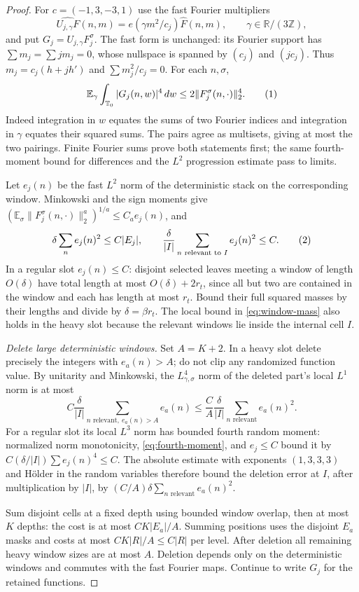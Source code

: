 \documentclass[11pt]{article}
\theoremstyle{definition}
\newcommand{\R}{\mathbb R}
\newcommand{\Z}{\mathbb Z}
\newcommand{\T}{\mathbb T}
\newcommand{\E}{\mathbb E}
\newcommand{\eqtag}[1]{\refstepcounter{equation}\tag{\theequation}\label{#1}}
\numberwithin{equation}{section}
\begin{document}
\begin{proof}
For $c=(-1,3,-3,1)$ use the fast Fourier multipliers
\[
 \widehat{U_{j,\gamma}F}(n,m)=e(\gamma m^2/c_j)\widehat F(n,m),
 \qquad \gamma\in\R/(3\Z),
\]
and put $G_j=U_{j,\gamma}F_j^\sigma$. The fast form is unchanged: its Fourier support has $\sum m_j=\sum jm_j=0$, whose nullspace is spanned by $(c_j)$ and $(jc_j)$. Thus $m_j=c_j(h+jh')$ and $\sum m_j^2/c_j=0$. For each $n,\sigma$,
\[
 \E_\gamma\int_{\T_0}|G_j(n,w)|^4\,dw
 \le2\|F_j^\sigma(n,\cdot)\|_2^4.
 \eqtag{eq:fourth-moment}
\]
Indeed integration in $w$ equates the sums of two Fourier indices and integration in $\gamma$ equates their squared sums. The pairs agree as multisets, giving at most the two pairings. Finite Fourier sums prove both statements first; the same fourth-moment bound for differences and the $L^2$ progression estimate pass to limits.

Let $e_j(n)$ be the fast $L^2$ norm of the deterministic stack on the corresponding window. Minkowski and the sign moments give $(\E_\sigma\|F_j^\sigma(n,\cdot)\|_2^a)^{1/a}\le C_a e_j(n)$, and
\[
 \delta\sum_ne_j(n)^2\le C|E_j|,\qquad
 \frac{\delta}{|I|}\sum_{n\text{ relevant to }I}e_j(n)^2\le C.
 \eqtag{eq:window-mass}
\]
In a regular slot $e_j(n)\le C$: disjoint selected leaves meeting a window of length $O(\delta)$ have total length at most $O(\delta)+2r_t$, since all but two are contained in the window and each has length at most $r_t$. Bound their full squared masses by their lengths and divide by $\delta=\beta r_t$. The local bound in \eqref{eq:window-mass} also holds in the heavy slot because the relevant windows lie inside the internal cell $I$.

\emph{Delete large deterministic windows.} Set $A=K+2$. In a heavy slot delete precisely the integers with $e_a(n)>A$; do not clip any randomized function value. By unitarity and Minkowski, the $L^4_{\gamma,\sigma}$ norm of the deleted part's local $L^1$ norm is at most
\[
 C\frac{\delta}{|I|}\sum_{n\text{ relevant},\ e_a(n)>A}e_a(n)
 \le\frac{C}{A}\frac{\delta}{|I|}\sum_{n\text{ relevant}}e_a(n)^2.
\]
For a regular slot its local $L^3$ norm has bounded fourth random moment: normalized norm monotonicity, \eqref{eq:fourth-moment}, and $e_j\le C$ bound it by $C(\delta/|I|)\sum e_j(n)^4\le C$. The absolute estimate with exponents $(1,3,3,3)$ and H\"older in the random variables therefore bound the deletion error at $I$, after multiplication by $|I|$, by $(C/A)\delta\sum_{n\text{ relevant}}e_a(n)^2$.

Sum disjoint cells at a fixed depth using bounded window overlap, then at most $K$ depths: the cost is at most $CK|E_a|/A$. Summing positions uses the disjoint $E_a$ masks and costs at most $CK|R|/A\le C|R|$ per level. After deletion all remaining heavy window sizes are at most $A$. Deletion depends only on the deterministic windows and commutes with the fast Fourier maps. Continue to write $G_j$ for the retained functions.


\end{proof}
\end{document}

